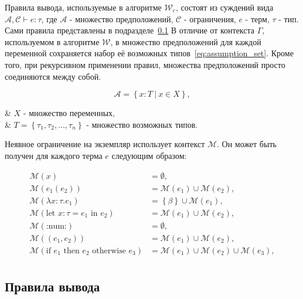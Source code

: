 Правила вывода, используемые в алгоритме $\mathcal{W}_c$, состоят из суждений вида $\mathcal{A}, \mathcal{C} \vdash e: \tau$, где $\mathcal{A}$ - множество предположений, $\mathcal{C}$ - ограничения, $e$ - терм, $\tau$ - тип.
Сами правила представлены в подразделе~\ref{subsec:inference_rules}
В отличие от контекста $\Gamma$, используемом в алгоритме $\mathcal{W}$, в множество предположений для каждой переменной сохраняется набор её возможных типов~\eqref{eq:assumption_set}.
Кроме того, при рекурсивном применении правил, множества предположений просто соединяются между собой.

\begin{equation}
    \label{eq:assumption_set}
    \mathcal{A} = \left\{ x: T ~|~ x \in X \right\},
\end{equation}
\begin{eqrem}
    & $X$ - множество переменных,                                                        \\
    & $T = \left\{ \tau_1, \tau_2, \ldots, \tau_n \right\}$ - множество возможных типов. \\
\end{eqrem}

Неявное ограничение на экземпляр использует контекст $\mathcal{M}$.
Он может быть получен для каждого терма $e$ следующим образом:

\begin{equation}
    \label{eq:monomorphic_set}
    \begin{aligned}
        \mathcal{M}(x) &= \emptyset, \\
        \mathcal{M}(e_1(e_2)) &= \mathcal{M}(e_1) \cup \mathcal{M}(e_2), \\
        \mathcal{M}(\lambda x: \tau. e_1) &= \left\{ \beta \right\} \cup \mathcal{M}(e_1), \\
        \mathcal{M}(\text{let } x: \tau = e_1 \text{ in } e_2) &= \mathcal{M}(e_1) \cup \mathcal{M}(e_2), \\
        \mathcal{M}(\text{:num:}) &= \emptyset, \\
        \mathcal{M}((e_1, e_2)) &= \mathcal{M}(e_1) \cup \mathcal{M}(e_2), \\
        \mathcal{M}(\text{if } e_1 \text{ then } e_2 \text{ otherwise } e_3) &= \mathcal{M}(e_1) \cup \mathcal{M}(e_2) \cup \mathcal{M}(e_3), \\
    \end{aligned}
\end{equation}

\subsection{Правила вывода}
\label{subsec:inference_rules}

